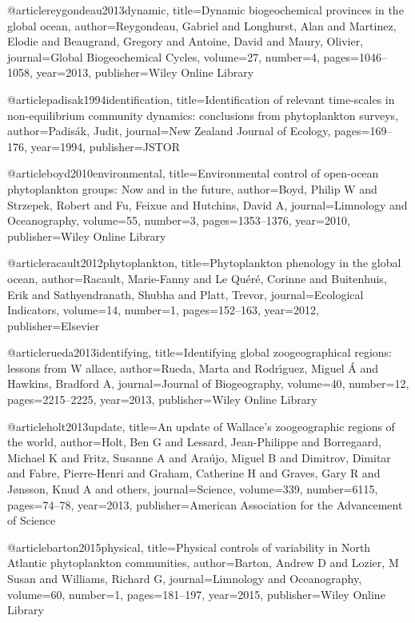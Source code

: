 {{{{{{{{{{{{{{{{{@article{reygondeau2013dynamic,
  title={Dynamic biogeochemical provinces in the global ocean},
  author={Reygondeau, Gabriel and Longhurst, Alan and Martinez, Elodie and Beaugrand, Gregory and Antoine, David and Maury, Olivier},
  journal={Global Biogeochemical Cycles},
  volume={27},
  number={4},
  pages={1046--1058},
  year={2013},
  publisher={Wiley Online Library}
}

@article{padisak1994identification,
  title={Identification of relevant time-scales in non-equilibrium community dynamics: conclusions from phytoplankton surveys},
  author={Padis{\'a}k, Judit},
  journal={New Zealand Journal of Ecology},
  pages={169--176},
  year={1994},
  publisher={JSTOR}
}


@article{boyd2010environmental,
  title={Environmental control of open-ocean phytoplankton groups: Now and in the future},
  author={Boyd, Philip W and Strzepek, Robert and Fu, Feixue and Hutchins, David A},
  journal={Limnology and Oceanography},
  volume={55},
  number={3},
  pages={1353--1376},
  year={2010},
  publisher={Wiley Online Library}
}


@article{racault2012phytoplankton,
  title={Phytoplankton phenology in the global ocean},
  author={Racault, Marie-Fanny and Le Qu{\'e}r{\'e}, Corinne and Buitenhuis, Erik and Sathyendranath, Shubha and Platt, Trevor},
  journal={Ecological Indicators},
  volume={14},
  number={1},
  pages={152--163},
  year={2012},
  publisher={Elsevier}
}





@article{rueda2013identifying,
  title={Identifying global zoogeographical regions: lessons from W allace},
  author={Rueda, Marta and Rodr{\'\i}guez, Miguel {\'A} and Hawkins, Bradford A},
  journal={Journal of Biogeography},
  volume={40},
  number={12},
  pages={2215--2225},
  year={2013},
  publisher={Wiley Online Library}
}


@article{holt2013update,
  title={An update of Wallace’s zoogeographic regions of the world},
  author={Holt, Ben G and Lessard, Jean-Philippe and Borregaard, Michael K and Fritz, Susanne A and Ara{\'u}jo, Miguel B and Dimitrov, Dimitar and Fabre, Pierre-Henri and Graham, Catherine H and Graves, Gary R and J{\o}nsson, Knud A and others},
  journal={Science},
  volume={339},
  number={6115},
  pages={74--78},
  year={2013},
  publisher={American Association for the Advancement of Science}
}


@article{barton2015physical,
  title={Physical controls of variability in North Atlantic phytoplankton communities},
  author={Barton, Andrew D and Lozier, M Susan and Williams, Richard G},
  journal={Limnology and Oceanography},
  volume={60},
  number={1},
  pages={181--197},
  year={2015},
  publisher={Wiley Online Library}
}

}}}}}}}}}}}}}}}}}

